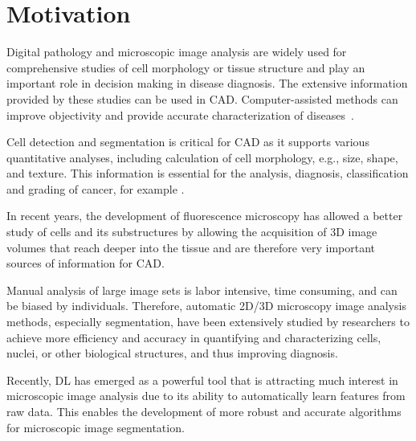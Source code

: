 \label{chap:intro}
\section{Motivation}
\label{section:motivation}

Digital pathology and microscopic image analysis are widely used for comprehensive studies of cell morphology or tissue structure and play an important role in decision making in disease diagnosis. The extensive information provided by these studies can be used in \ac{CAD}. Computer-assisted methods can improve objectivity and provide accurate characterization of diseases~\cite{review:1}. 

Cell detection and segmentation is critical for \ac{CAD} as it supports various quantitative analyses, including calculation of cell morphology, e.g., size, shape, and texture. This information is essential for the analysis, diagnosis, classification and grading of cancer, for example \cite{review:2}.

In recent years, the development of fluorescence microscopy has allowed a better study of cells and its substructures by allowing the acquisition of \ac{3D} image volumes that reach deeper into the tissue \cite{fluorescence} and are therefore very important sources of information for \ac{CAD}.

Manual analysis of large image sets is labor intensive, time consuming, and can be biased by individuals. Therefore, automatic \ac{2D}/\ac{3D} microscopy image analysis methods, especially segmentation, have been extensively studied by researchers \cite{review:2021deep} to achieve more efficiency and accuracy in quantifying and characterizing cells, nuclei, or other biological structures, and thus improving diagnosis.

Recently, \ac{DL} has emerged as a powerful tool that is attracting much interest in microscopic image analysis \cite{review:3} due to its ability to automatically learn features from raw data. This enables the development of more robust and accurate algorithms for microscopic image segmentation. 

